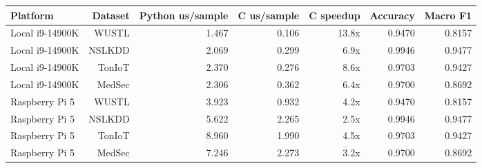 \begin{tabular}{lrrrrrr}
\toprule
Platform & Dataset & Python us/sample & C us/sample & C speedup & Accuracy & Macro F1 \\
\midrule
Local i9-14900K & WUSTL & 1.467 & 0.106 & 13.8x & 0.9470 & 0.8157 \\
Local i9-14900K & NSLKDD & 2.069 & 0.299 & 6.9x & 0.9946 & 0.9477 \\
Local i9-14900K & TonIoT & 2.370 & 0.276 & 8.6x & 0.9703 & 0.9427 \\
Local i9-14900K & MedSec & 2.306 & 0.362 & 6.4x & 0.9700 & 0.8692 \\
Raspberry Pi 5 & WUSTL & 3.923 & 0.932 & 4.2x & 0.9470 & 0.8157 \\
Raspberry Pi 5 & NSLKDD & 5.622 & 2.265 & 2.5x & 0.9946 & 0.9477 \\
Raspberry Pi 5 & TonIoT & 8.960 & 1.990 & 4.5x & 0.9703 & 0.9427 \\
Raspberry Pi 5 & MedSec & 7.246 & 2.273 & 3.2x & 0.9700 & 0.8692 \\
\bottomrule
\end{tabular}
